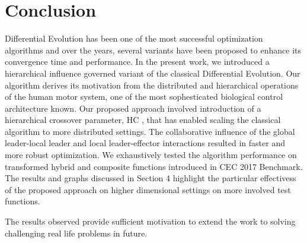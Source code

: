 \section{Conclusion}
%
Differential Evolution has been one of the most successful optimization algorithms and over the years, several variants have been proposed to enhance its convergence time and performance. In the present work, we introduced a hierarchical influence governed variant of the classical Differential Evolution. Our algorithm derives its motivation from the distributed and hierarchical operations of the human motor system, one of the most sophesticated biological control architecture known. Our proposed approach involved introduction of a hierarchical crossover parameter, HC , that has enabled scaling the classical algorithm to more distributed settings. The collaborative influence of the global leader-local leader and local leader-effector interactions resulted in faster and more robust optimization. We exhaustively tested the algorithm performance on transformed hybrid and composite functions introduced in CEC 2017 Benchmark. The results and graphs discussed in Section 4 highlight the particular effectivess of the proposed approach on higher dimensional settings on more involved test functions.

The results observed provide sufficient motivation to extend the work to solving challenging real life problems in future. 






